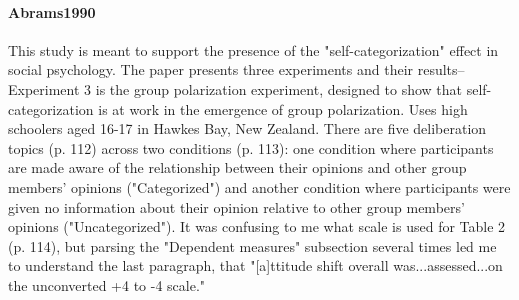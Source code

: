 \documentclass[12pt, letterpaper]{article}
\begin{document}
\paragraph{{Abrams1990}} This study is meant to support the presence of the "self-categorization" effect in
social psychology. The paper presents three experiments and their results--Experiment 3 is the group polarization
experiment, designed to show that self-categorization is at work in the emergence of group polarization. Uses high
schoolers aged 16-17 in Hawkes Bay, New Zealand. There are five deliberation topics (p. 112) across two conditions
(p. 113): one condition where participants are made aware of the relationship between their opinions and other group
members' opinions ("Categorized") and another condition where participants were given no information about their
opinion relative to other group members' opinions ("Uncategorized"). It was confusing to me what scale is used for
Table 2 (p. 114), but parsing the "Dependent measures" subsection several times led me to understand the last
paragraph, that "[a]ttitude shift overall was...assessed...on the unconverted +4 to -4 scale."
\end{document}
